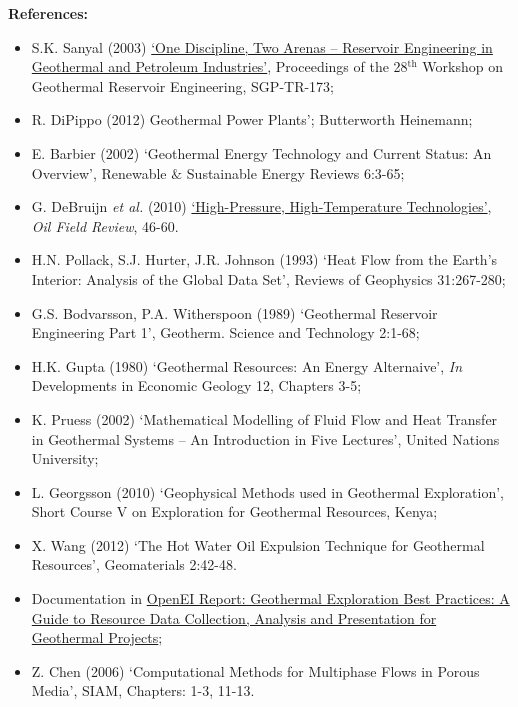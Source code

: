 \documentclass[12pts,a4paper,amsmath,amssymb,floatfix]{article}%
\newcommand{\etall}{{\it et al. }}
\begin{document}
\begin{enumerate}[label=\bfseries Project: \arabic*:]
\noindent
{\bf References:}
\begin{itemize}
\item S.K. Sanyal (2003) \href{https://www.slb.com/~/media/Files/geothermal/tech_papers/sanyal_one_discipline_two_arenas_reservoir_engineering_in_geothermal_petroleum_industries_2003.pdf}{`One Discipline, Two Arenas -- Reservoir Engineering in Geothermal and Petroleum Industries'}, Proceedings of the 28$^{\text{th}}$ Workshop on Geothermal Reservoir Engineering, SGP-TR-173;
\item R. DiPippo (2012) Geothermal Power Plants'; Butterworth Heinemann;
\item E. Barbier (2002) `Geothermal Energy Technology and Current Status: An Overview', Renewable $\&$ Sustainable Energy Reviews 6:3-65;
\item G. DeBruijn \etall (2010) \href{https://www.slb.com/~/media/Files/resources/oilfield_review/ors08/aut08/high_pressure_high_temperature.pdf}{`High-Pressure, High-Temperature Technologies'}, {\it Oil Field Review}, 46-60.
\item H.N. Pollack, S.J. Hurter, J.R. Johnson (1993) `Heat Flow from the Earth's Interior: Analysis of the Global Data Set', Reviews of Geophysics 31:267-280;
\item G.S. Bodvarsson, P.A. Witherspoon (1989) `Geothermal Reservoir Engineering Part 1', Geotherm. Science and Technology 2:1-68;
\item H.K. Gupta (1980) `Geothermal Resources: An Energy Alternaive', {\it In} Developments in Economic Geology 12, Chapters 3-5;
\item K. Pruess (2002) `Mathematical Modelling of Fluid Flow and Heat Transfer in Geothermal Systems -- An Introduction in Five Lectures', United Nations University;
\item L. Georgsson (2010) `Geophysical Methods used in Geothermal Exploration', Short Course V on Exploration for Geothermal Resources, Kenya;
\item X. Wang (2012) `The Hot Water Oil Expulsion Technique for Geothermal Resources', Geomaterials 2:42-48.
\item Documentation in \href{http://en.openei.org/wiki/Geothermal_Exploration_Best_Practices:_A_Guide_to_Resource_Data_Collection,_Analysis_and_Presentation_for_Geothermal_Projects}{OpenEI Report: Geothermal Exploration Best Practices: A Guide to Resource Data Collection, Analysis and Presentation for Geothermal Projects};
\item Z. Chen (2006) `Computational Methods for Multiphase Flows in Porous Media', SIAM, Chapters: 1-3, 11-13.
\end{itemize}


\end{enumerate}
\end{document}
